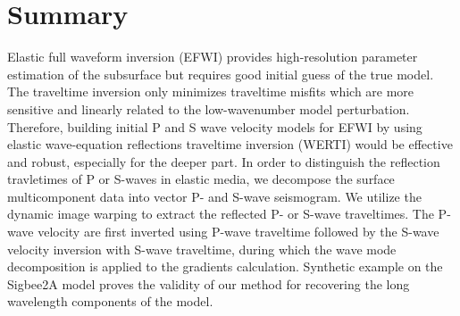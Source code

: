 \section{Summary}
Elastic full waveform inversion (EFWI) provides high-resolution parameter estimation of the
subsurface but requires good initial guess of the true model.
The traveltime inversion only minimizes traveltime misfits which are more sensitive and
linearly related to the low-wavenumber model perturbation.
Therefore, building initial P and S wave velocity models for EFWI by using elastic wave-equation
reflections traveltime inversion (WERTI) would be effective and robust, especially for the deeper part. 
In order to distinguish the reflection travletimes of P or S-waves in elastic media,
we decompose the surface multicomponent data into vector P- and S-wave seismogram.
We utilize the dynamic image warping to extract the reflected P- or S-wave
traveltimes.
The P-wave velocity are first inverted using P-wave traveltime followed by the S-wave velocity
inversion with S-wave traveltime,
during which the wave mode decomposition is applied to the gradients calculation.
Synthetic example on the Sigbee2A model proves the validity
of our method for recovering the long wavelength components of the model.
\onecolumn

